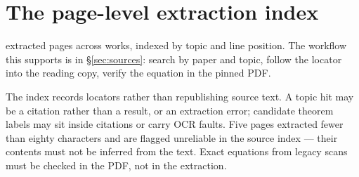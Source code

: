 \section{The page-level extraction index}
\label{app:extraction}

\ExtractedPages{} extracted pages across \ExtractedWorks{} works,
indexed by topic and line position. The workflow this supports is in
\S\ref{sec:sources}: search by paper and topic, follow the locator into
the reading copy, verify the equation in the pinned PDF.

The index records locators rather than republishing source text. A
topic hit may be a citation rather than a result, or an extraction
error; candidate theorem labels may sit inside citations or carry OCR
faults. Five pages extracted fewer than eighty characters and are
flagged unreliable in the source index --- their contents must not be
inferred from the text. Exact equations from legacy scans must be
checked in the PDF, not in the extraction.


